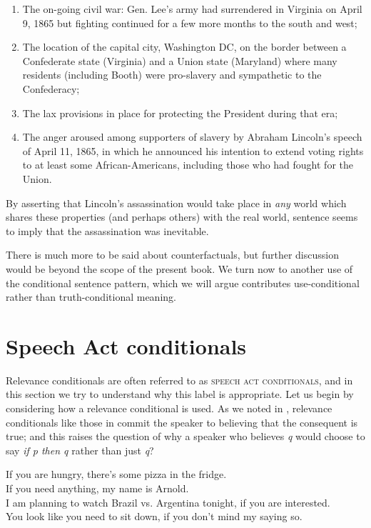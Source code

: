 \begin{enumerate}
\item The on-going civil war: Gen. Lee’s army had surrendered in Virginia on April 9, 1865 but fighting continued for a few more months to the south and west;
\item The location of the capital city, Washington DC, on the border between a Confederate state (Virginia) and a Union state (Maryland) where many residents (including Booth) were pro-slavery and sympathetic to the Confederacy;
\item The lax provisions in place for protecting the President during that era;
\item The anger aroused among supporters of slavery by Abraham Lincoln’s speech of April 11, 1865, in which he announced his intention to extend voting rights to at least some African-Americans, including those who had fought for the Union.
\end{enumerate}

By asserting that Lincoln’s assassination would take place in \textit{any} world which shares these properties (and perhaps others) with the real world, sentence  seems to imply that the assassination was inevitable.



There is much more to be said about counterfactuals, but further discussion would be beyond the scope of the present book. We turn now to another use of the conditional sentence pattern, which we will argue contributes use-conditional rather than truth-conditional meaning.


\section{Speech Act conditionals}\label{sec:19.7}

Relevance conditionals are often referred to as \textsc{speech act conditionals}, and in this section we try to understand why this label is appropriate. Let us begin by considering how a relevance conditional is used. As we noted in , relevance conditionals like those in  commit the speaker to believing that the consequent is true; and this raises the question of why a speaker who believes \textit{q} would choose to say \textit{if p then q} rather than just \textit{q}?


\ea
\ea If you are hungry, there’s some pizza in the fridge.\\
\ex If you need anything, my name is Arnold.\\
\ex I am planning to watch Brazil vs. Argentina tonight, if you are interested.\\
\ex You look like you need to sit down, if you don’t mind my saying so.
                       \z
\z


